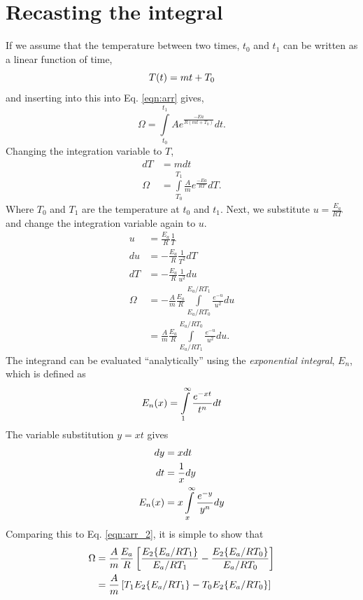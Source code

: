 \documentclass{article}
\begin{document}
\section{Recasting the integral}
If we assume that the temperature between two times, $t_0$ and $t_1$ can be written as a linear function of time,
\begin{equation}
  T\qty(t) = mt + T_0
\end{equation}
and inserting into this into Eq. \ref{eqn:arr} gives,
\begin{equation}
  \Omega = \int\limits_{t_0}^{t_1} A e^{\frac{-Ea}{R\left(mt + T_0\right)}} dt.
\end{equation}
Changing the integration variable to $T$,
\begin{align}
  dT &= mdt \\
  \Omega &= \int\limits_{T_0}^{T_1} \frac{A}{m}e^{\frac{-Ea}{RT}} dT.
\end{align}
Where $T_0$ and $T_1$ are the temperature at $t_0$ and $t_1$. Next, we substitute $u = \frac{E_a}{RT}$ and change the integration variable again to $u$.
\begin{align}
  u &= \frac{E_a}{R} \frac{1}{T}  \\
  du &= -\frac{E_a}{R} \frac{1}{T^{2}} dT  \\
  dT &= -\frac{E_a}{R} \frac{1}{u^{2}} du  \\
  \Omega &= -\frac{A}{m}\frac{E_a}{R} \int\limits_{E_a / R T_0}^{E_a / R T_1} \frac{e^{-u}}{u^2} du  \\
  \label{eqn:arr_2}
         &=  \frac{A}{m}\frac{E_a}{R} \int\limits_{E_a / R T_1}^{E_a / R T_0} \frac{e^{-u}}{u^2} du.
\end{align}
The integrand can be evaluated ``analytically'' using the \emph{exponential integral}, $E_n$, which is defined as\cite{1970--handbookofmathematicalfunctionswithformulas}
\begin{equation}
  E_n\qty(x) = \int\limits_{1}^{\infty} \frac{e^{-xt}}{t^n} dt
\end{equation}
The variable substitution $y = xt$ gives
\begin{align}
  dy &= xdt \\
  dt &= \frac{1}{x}dy \\
  E_n\qty(x) &= x\int\limits_{x}^{\infty} \frac{e^{-y}}{y^n} dy
\end{align}
Comparing this to Eq. \ref{eqn:arr_2}, it is simple to show that
\begin{align}
  \Omega &= \frac{A}{m}\frac{E_a}{R} \left[\frac{E_2\qty{E_a/RT_1}}{E_a/RT_1} - \frac{E_2\qty{E_a/RT_0}}{E_a/RT_0}\right] \\
         &= \frac{A}{m}              \left[T_1 E_2\qty{E_a/RT_1}              - T_0 E_2\qty{E_a/RT_0}             \right]
\end{align}
\end{document}
